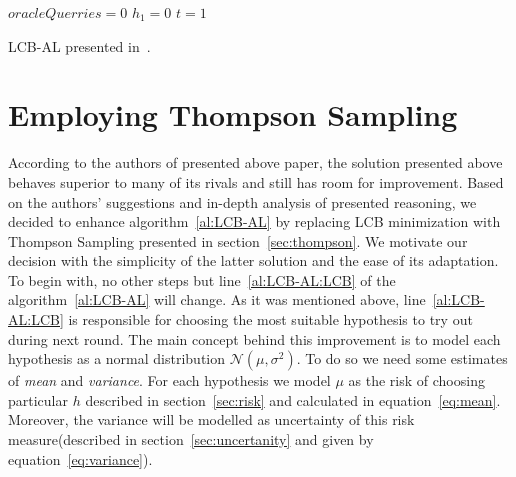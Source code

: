 \documentclass[12pt, a4paper, pdflatex, leqno, twoside]{report}
\begin{document}
\vspace{2cm}
\begin{algorithm}[H]
 \LinesNumbered
 $oracleQuerries = 0$\;
 $h_1 = 0$\;
 $t = 1$\;
 \caption{LCB-AL presented in~\citep{DBLP:journals/corr/GantiG13}.\label{al:LCB-AL}}
\end{algorithm}
\vspace{2cm}


\section{Employing Thompson Sampling\label{sec:thompsonimprovement}}
According to the authors of presented above paper, the solution presented above behaves superior to many of its 
rivals and still has room for improvement. Based on the authors' suggestions and 
in-depth analysis of presented reasoning, we decided to enhance 
algorithm~\ref{al:LCB-AL} by replacing LCB minimization with Thompson Sampling presented in section~\ref{sec:thompson}. 
We motivate our decision with the simplicity of the latter solution and the ease of its adaptation.\\

To begin with, no other steps but line~\ref{al:LCB-AL:LCB} of the algorithm~\ref{al:LCB-AL} will change. As it was mentioned above, line~\ref{al:LCB-AL:LCB} is 
responsible for choosing the most suitable hypothesis to try out during next 
round. The main concept behind this improvement is to model each hypothesis as a 
normal distribution $\mathcal{N}\left( \mu, \sigma^2 \right)$. To do so we need 
some estimates of \emph{mean} and \emph{variance}. For each hypothesis we model $\mu$ as the risk of choosing particular $h$ described in 
section~\ref{sec:risk} and calculated in equation~\ref{eq:mean}. Moreover, the 
variance will be modelled as uncertainty of this risk measure(described in 
section~\ref{sec:uncertanity} and given by equation~\ref{eq:variance}).\\
\end{document}
